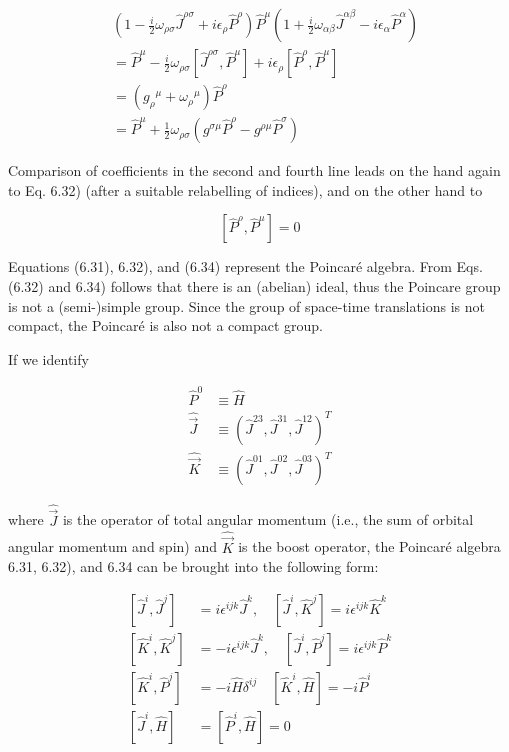 \documentclass[10pt, letterpaper]{article}
\begin{document}
$$
\begin{aligned}
& \left(1-\frac{i}{2} \omega_{\rho \sigma} \hat{J}^{\rho \sigma}+i \epsilon_{\rho} \hat{P}^{\rho}\right) \hat{P}^{\mu}\left(1+\frac{i}{2} \omega_{\alpha \beta} \hat{J}^{\alpha \beta}-i \epsilon_{\alpha} \hat{P}^{\alpha}\right) \\
& =\hat{P}^{\mu}-\frac{i}{2} \omega_{\rho \sigma}\left[\hat{J}^{\rho \sigma}, \hat{P}^{\mu}\right]+i \epsilon_{\rho}\left[\hat{P}^{\rho}, \hat{P}^{\mu}\right] \\
& =\left(g_{\rho}{ }^{\mu}+\omega_{\rho}{ }^{\mu}\right) \hat{P}^{\rho} \\
& =\hat{P}^{\mu}+\frac{1}{2} \omega_{\rho \sigma}\left(g^{\sigma \mu} \hat{P}^{\rho}-g^{\rho \mu} \hat{P}^{\sigma}\right)
\end{aligned}
$$

Comparison of coefficients in the second and fourth line leads on the hand again to Eq. 6.32) (after a suitable relabelling of indices), and on the other hand to

$$
\left[\hat{P}^{\rho}, \hat{P}^{\mu}\right]=0
$$

Equations (6.31), 6.32), and (6.34) represent the Poincaré algebra. From Eqs. (6.32) and 6.34) follows that there is an (abelian) ideal, thus the Poincare group is not a (semi-)simple group. Since the group of space-time translations is not compact, the Poincaré is also not a compact group.

If we identify

$$
\begin{aligned}
\hat{P}^{0} & \equiv \hat{H} \\
\hat{\vec{J}} & \equiv\left(\hat{J}^{23}, \hat{J}^{31}, \hat{J}^{12}\right)^{T} \\
\hat{\vec{K}} & \equiv\left(\hat{J}^{01}, \hat{J}^{02}, \hat{J}^{03}\right)^{T}
\end{aligned}
$$

where $\hat{\vec{J}}$ is the operator of total angular momentum (i.e., the sum of orbital angular momentum and spin) and $\hat{\vec{K}}$ is the boost operator, the Poincaré algebra 6.31, 6.32), and 6.34 can be brought into the following form:

$$
\begin{aligned}
{\left[\hat{J}^{i}, \hat{J}^{j}\right] } & =i \epsilon^{i j k} \hat{J}^{k}, \quad\left[\hat{J}^{i}, \hat{K}^{j}\right]=i \epsilon^{i j k} \hat{K}^{k} \\
{\left[\hat{K}^{i}, \hat{K}^{j}\right] } & =-i \epsilon^{i j k} \hat{J}^{k}, \quad\left[\hat{J}^{i}, \hat{P}^{j}\right]=i \epsilon^{i j k} \hat{P}^{k} \\
{\left[\hat{K}^{i}, \hat{P}^{j}\right] } & =-i \hat{H} \delta^{i j} \quad\left[\hat{K}^{i}, \hat{H}\right]=-i \hat{P}^{i} \\
{\left[\hat{J}^{i}, \hat{H}\right] } & =\left[\hat{P}^{i}, \hat{H}\right]=0
\end{aligned}
$$
\end{document}
